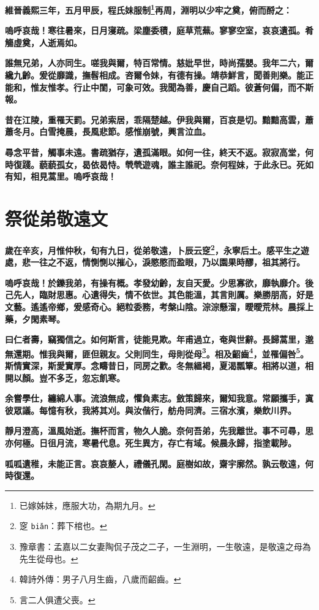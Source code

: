 \textbf{維晉義熙三年，五月甲辰，程氏妹服制\footnote{已嫁姊妹，應服大功，為期九月。}再周，淵明以少牢之奠，俯而酹之：}

\textbf{嗚呼哀哉！寒往暑來，日月寖疏。梁塵委積，庭草荒蕪。寥寥空室，哀哀遺孤。肴觴虛奠，人逝焉如。}

\textbf{誰無兄弟，人亦同生。嗟我與爾，特百常情。慈妣早世，時尚孺嬰。我年二六，爾纔九齡。爰從靡識，撫髫相成。咨爾令妹，有德有操。靖恭鮮言，聞善則樂。能正能和，惟友惟孝。行止中閨，可象可效。我聞為善，慶自己蹈。彼蒼何偏，而不斯報。}

\textbf{昔在江陵，重罹天罰。兄弟索居，乖隔楚越。伊我與爾，百哀是切。黯黯高雲，蕭蕭冬月。白雪掩晨，長風悲節。感惟崩號，興言泣血。}

\textbf{尋念平昔，觸事未遠。書疏猶存，遺孤滿眼。如何一往，終天不返。寂寂高堂，何時復踐。藐藐孤女，曷依曷恃。煢煢遊魂，誰主誰祀。奈何程妹，于此永已。死如有知，相見蒿里。嗚呼哀哉！}

\section{祭從弟敬遠文}

\textbf{歲在辛亥，月惟仲秋，旬有九日，從弟敬遠，卜辰云窆\footnote{窆 \texttt{biǎn}：葬下棺也。}，永寧后土。感平生之遊處，悲一往之不返，情惻惻以摧心，淚愍愍而盈眼，乃以園果時醪，祖其將行。}

\textbf{嗚呼哀哉！於鑠我弟，有操有概。孝發幼齡，友自天愛。少思寡欲，靡執靡介。後己先人，臨財思惠。心遺得失，情不依世。其色能溫，其言則厲。樂勝朋高，好是文藝。遙遙帝鄉，爰感奇心。絕粒委務，考槃山陰。淙淙懸溜，曖曖荒林。晨採上藥，夕閑素琴。}

\textbf{曰仁者壽，竊獨信之。如何斯言，徒能見欺。年甫過立，奄與世辭。長歸蒿里，邈無還期。惟我與爾，匪但親友。父則同生，母則從母\footnote{豫章書：孟嘉以二女妻陶侃子茂之二子，一生淵明，一生敬遠，是敬遠之母為先生從母也。}。相及齠齒\footnote{韓詩外傳：男子八月生齒，八歲而齠齒。}，並罹偏咎\footnote{言二人俱遭父喪。}。斯情實深，斯愛實厚。念疇昔日，同房之歡。冬無縕褐，夏渴瓢簞。相將以道，相開以顏。豈不多乏，忽忘飢寒。}

\textbf{余嘗學仕，纏綿人事。流浪無成，懼負素志。斂策歸來，爾知我意。常願攜手，寘彼眾議。每憶有秋，我將其刈。與汝偕行，舫舟同濟。三宿水濱，樂飲川界。}

\textbf{靜月澄高，溫風始逝。撫杯而言，物久人脆。奈何吾弟，先我離世。事不可尋，思亦何極。日徂月流，寒暑代息。死生異方，存亡有域。候晨永歸，指塗載陟。}

\textbf{呱呱遺稚，未能正言。哀哀嫠人，禮儀孔閑。庭樹如故，齋宇廓然。孰云敬遠，何時復還。}


